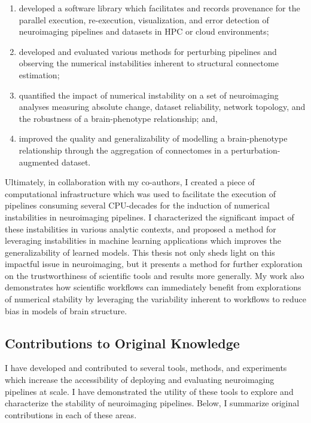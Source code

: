 \begin{enumerate}[label=(\roman*)]
\item developed a software library which facilitates and records provenance for the parallel execution,
re-execution, visualization, and error detection of neuroimaging pipelines and datasets in HPC or cloud environments;
\item developed and evaluated various methods for perturbing pipelines and observing the numerical instabilities
inherent to structural connectome estimation;
\item quantified the impact of numerical instability on a set of neuroimaging analyses measuring absolute change,
dataset reliability, network topology, and the robustness of a brain-phenotype relationship; and,
\item improved the quality and generalizability of modelling a brain-phenotype relationship through the aggregation of
connectomes in a perturbation-augmented dataset.
\end{enumerate}

Ultimately, in collaboration with my co-authors, I created a piece of computational infrastructure which was used to
facilitate the execution of pipelines consuming several CPU-decades for the induction of numerical instabilities in
neuroimaging pipelines. I characterized the significant impact of these instabilities in various analytic contexts, and
proposed a method for leveraging instabilities in machine learning applications which improves the generalizability of
learned models. This thesis not only sheds light on this impactful issue in neuroimaging, but it presents a method for
further exploration on the trustworthiness of scientific tools and results more generally. My work also demonstrates
how scientific workflows can immediately benefit from explorations of numerical stability by leveraging the variability
inherent to workflows to reduce bias in models of brain structure.

\subsection{Contributions to Original Knowledge}
I have developed and contributed to several tools, methods, and experiments which increase the accessibility of
deploying and evaluating neuroimaging pipelines at scale. I have demonstrated the utility of these tools to explore and
characterize the stability of neuroimaging pipelines. Below, I summarize original contributions in each of these areas.

